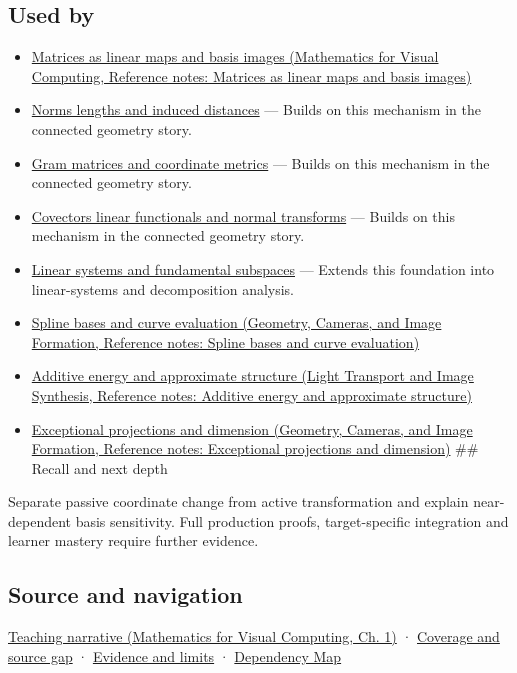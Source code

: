\subsection{Used by}\label{appendix-ce0341f7ea0d-used-by}

\begin{itemize}
\item
  \href{../02-Mathematics-for-Visual-Computing/main.pdf\#nameddest=appendix-bd39c3bf5d64}{Matrices as linear maps and basis images (Mathematics for Visual Computing, Reference notes: Matrices as linear maps and basis images)}
\item
  \hyperref[appendix-49933872bb51]{Norms lengths and induced distances} --- Builds on this mechanism in the connected geometry story.
\item
  \hyperref[appendix-3b863809f82a]{Gram matrices and coordinate metrics} --- Builds on this mechanism in the connected geometry story.
\item
  \hyperref[appendix-46da295c6787]{Covectors linear functionals and normal transforms} --- Builds on this mechanism in the connected geometry story.
\item
  \hyperref[appendix-8572a4a060c1]{Linear systems and fundamental subspaces} --- Extends this foundation into linear-systems and decomposition analysis.
\item
  \href{../03-Geometry-Cameras-and-Image-Formation/main.pdf\#nameddest=appendix-f28eeec97a3d}{Spline bases and curve evaluation (Geometry, Cameras, and Image Formation, Reference notes: Spline bases and curve evaluation)}
\item
  \href{../04-Light-Transport-and-Image-Synthesis/main.pdf\#nameddest=appendix-b0732b22e7d6}{Additive energy and approximate structure (Light Transport and Image Synthesis, Reference notes: Additive energy and approximate structure)}
\item
  \href{../03-Geometry-Cameras-and-Image-Formation/main.pdf\#nameddest=appendix-3c73f7862157}{Exceptional projections and dimension (Geometry, Cameras, and Image Formation, Reference notes: Exceptional projections and dimension)} \#\# Recall and next depth
\end{itemize}

Separate passive coordinate change from active transformation and explain near-dependent basis sensitivity. Full production proofs, target-specific integration and learner mastery require further evidence.

\subsection{Source and navigation}\label{appendix-ce0341f7ea0d-source-and-navigation}

\href{../02-Mathematics-for-Visual-Computing/main.pdf\#nameddest=01-foundations-i-ch017-a-basis-is-a-measuring-arrangement-not-the-vector-itself}{Teaching narrative (Mathematics for Visual Computing, Ch. 1)} · \hyperref[appendix-fd090d982a15-phase-6---parts-501-600]{Coverage and source gap} · \hyperref[appendix-a103e7846d21-phase-6---source-analysis-and-verification]{Evidence and limits} · \hyperref[appendix-4ad47bdd269a]{Dependency Map}
